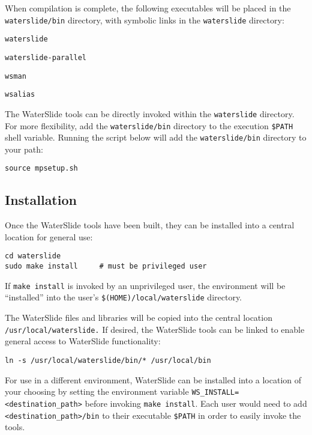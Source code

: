 \documentclass[11pt]{article}
\begin{document}
When compilation is complete, the following executables will be placed in the \texttt{waterslide/bin}
directory, with symbolic links in the \texttt{waterslide} directory:
\nopagebreak
\begin{itemize*}
\item \texttt{waterslide}
\item \texttt{waterslide-parallel}
\item \texttt{wsman}
\item \texttt{wsalias}
\end{itemize*}
The WaterSlide tools can be directly invoked within the \texttt{waterslide} directory. For
more flexibility, add the \texttt{waterslide/bin} directory to the execution \texttt{\$PATH} shell
variable.  Running the script below will add the \texttt{waterslide/bin} directory to your path:

\begin{lstlisting}
source mpsetup.sh
\end{lstlisting}

\subsection{Installation}\label{sec-install}

Once the WaterSlide tools have been built, they can be installed into a central
location for general use:

\begin{lstlisting}
cd waterslide
sudo make install     # must be privileged user
\end{lstlisting}
\nopagebreak
{\note If \texttt{make install} is invoked by an unprivileged user, the environment will
be ``installed'' into the user's \texttt{\$(HOME)/local/waterslide} directory.}

The WaterSlide files and libraries will be copied into the central location
\texttt{/usr/local/waterslide.} If desired, the WaterSlide tools can be linked to enable general access to WaterSlide
functionality:
\nopagebreak
\begin{lstlisting}
ln -s /usr/local/waterslide/bin/* /usr/local/bin
\end{lstlisting}

For use in a different environment, WaterSlide can be installed into a
location of your choosing by setting the environment variable
\texttt{WS\_INSTALL=<destination\_path>} before invoking \texttt{make install}. Each user would
need to add \texttt{<destination\_path>/bin} to their executable \texttt{\$PATH} in order to easily
invoke the tools.
\end{document}
